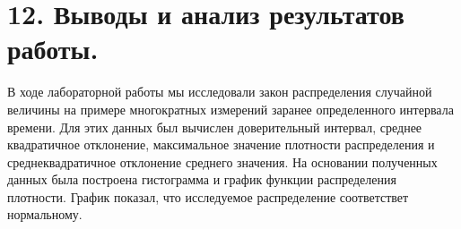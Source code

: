 \documentclass[14pt]{extreport}
\begin{document}
\section*{12. Выводы и анализ результатов работы.}
В ходе лабораторной работы мы исследовали закон распределения случайной величины на примере многократных измерений заранее определенного интервала времени. Для этих данных был вычислен доверительный интервал, среднее квадратичное отклонение, максимальное значение плотности распределения и среднеквадратичное отклонение среднего значения. На основании полученных данных была построена гистограмма и график функции распределения плотности. График показал, что исследуемое распределение соответствет нормальному.
\end{document}
